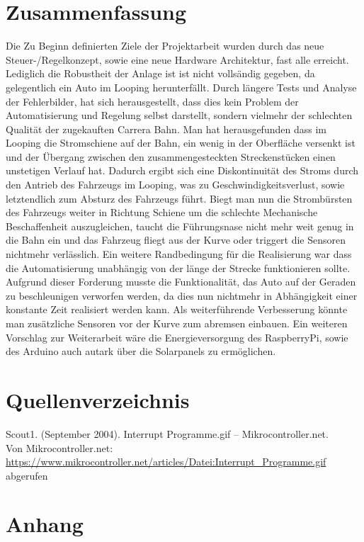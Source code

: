 \documentclass[a4paper, 11pt]{report}
\begin{document}
\chapter{Zusammenfassung}
Die Zu Beginn definierten Ziele der Projektarbeit wurden durch das neue Steuer-/Regelkonzept, sowie eine neue Hardware Architektur, fast alle erreicht. Lediglich die Robustheit der Anlage ist ist nicht vollsändig gegeben, da gelegentlich ein Auto im Looping herunterfällt.
Durch längere Tests und Analyse der Fehlerbilder, hat sich herausgestellt, dass dies kein Problem der Automatisierung und Regelung selbst darstellt, sondern vielmehr der schlechten Qualität der zugekauften Carrera Bahn.
Man hat herausgefunden dass im Looping die Stromschiene auf der Bahn, ein wenig in der Oberfläche versenkt ist und der Übergang zwischen den zusammengesteckten Streckenstücken einen unstetigen Verlauf hat. Dadurch ergibt sich eine Diskontinuität des Stroms durch den Antrieb des Fahrzeugs im Looping, was zu Geschwindigkeitsverlust, sowie letztendlich zum Absturz des Fahrzeugs führt. Biegt man nun die Strombürsten des Fahrzeugs weiter in Richtung Schiene um die schlechte Mechanische Beschaffenheit auszugleichen, taucht die Führungsnase nicht mehr weit genug in die Bahn ein und das Fahrzeug fliegt aus der Kurve oder triggert die Sensoren nichtmehr verlässlich.
Ein weitere Randbedingung für die Realisierung war dass die Automatisierung unabhängig von der länge der Strecke funktionieren sollte.
Aufgrund dieser Forderung musste die Funktionalität, das Auto auf der Geraden zu beschleunigen verworfen werden, da dies nun nichtmehr in Abhängigkeit einer konstante Zeit realisiert werden kann. Als weiterführende Verbesserung könnte man zusätzliche Sensoren vor der Kurve zum abremsen einbauen.
Ein weiteren Vorschlag zur Weiterarbeit wäre die Energieversorgung des RaspberryPi, sowie des Arduino auch autark über die Solarpanels zu ermöglichen.




\chapter{Quellenverzeichnis}
Scout1. (September 2004). Interrupt Programme.gif – Mikrocontroller.net. 
\\Von Mikrocontroller.net: \href{https://www.mikrocontroller.net/articles/Datei:Interrupt_Programme.gif}
{\url{https://www.mikrocontroller.net/articles/Datei:Interrupt_Programme.gif}} abgerufen \label{src:scout1}
\chapter{Anhang}
\end{document}
